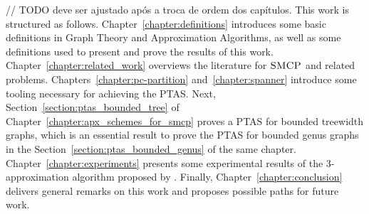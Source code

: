 // TODO deve ser ajustado após a troca de ordem dos capítulos.
This work is structured as follows. Chapter~\ref{chapter:definitions} introduces some basic definitions in Graph Theory and Approximation Algorithms, as well as some definitions used to present and prove the results of this work. Chapter~\ref{chapter:related_work} overviews the literature for \(\textsc{SMCP}\) and related problems. Chapters~\ref{chapter:pc-partition} and~\ref{chapter:spanner} introduce some tooling necessary for achieving the PTAS. Next, Section~\ref{section:ptas_bounded_tree} of Chapter~\ref{chapter:apx_schemes_for_smcp} proves a PTAS for bounded treewidth graphs, which is an essential result to prove the PTAS for bounded genus graphs in the Section~\ref{section:ptas_bounded_genus} of the same chapter. Chapter~\ref{chapter:experiments} presents some experimental results of the 3-approximation algorithm proposed by \cite{smcp_3apx}. Finally, Chapter~\ref{chapter:conclusion} delivers general remarks on this work and proposes possible paths for future work.
